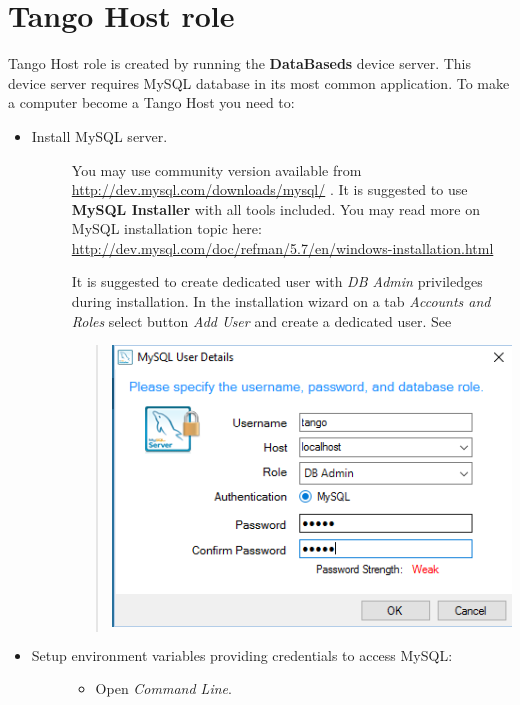 \documentclass[letterpaper,10pt,english]{sphinxmanual}
\begin{document}
\section{Tango Host role}
\label{tango-on-windows:tango-host-role}
Tango Host role is created by running the \textbf{DataBaseds} device server. This device server requires MySQL
database in its most common application. To make a computer become a Tango Host you need to:
\begin{itemize}
\item {} \begin{description}
\item[{Install MySQL server.}] \leavevmode
You may use community version available from \href{http://dev.mysql.com/downloads/mysql/}{http://dev.mysql.com/downloads/mysql/} . It is suggested to use
\textbf{MySQL Installer} with all tools included. You may read more on MySQL installation topic here:
\href{http://dev.mysql.com/doc/refman/5.7/en/windows-installation.html}{http://dev.mysql.com/doc/refman/5.7/en/windows-installation.html}

It is suggested to create dedicated  user with \emph{DB Admin} priviledges during installation.
In the installation wizard on a tab \emph{Accounts and Roles} select button \emph{Add User}
and create a dedicated user. See
\begin{quote}

\includegraphics{mysql-user-02.png}
\end{quote}

\end{description}

\item {} \begin{description}
\item[{Setup environment variables providing credentials to access MySQL:}] \leavevmode\begin{itemize}
\item {} 
Open \emph{Command Line}.


\end{itemize}
\end{description}
\end{itemize}
\end{document}
